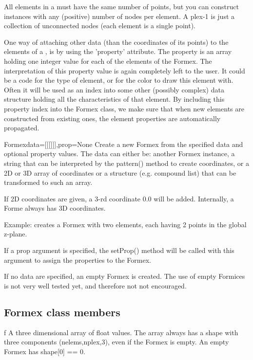 All elements in a  must have the same number of points, but you can construct  instances with any (positive) number of nodes per element. A plex-1  is just a collection of unconnected nodes (each element is a single point).

One way of attaching other data (than the coordinates of its points) to the elements of a , is by using the 'property' attribute. The property is an array holding one integer value for each of the elements of the Formex. The interpretation of this property value is again completely left to the user. It could be a code for the type of element, or for the color to draw this element with. Often it will be used as an index into some other (possibly complex) data structure holding all the characteristics of that element. 
By including this property index into the Formex class, we make sure that when new elements are constructed from existing ones, the element properties are automatically propagated.


\begin{classdesc}{Formex}{data=[[[]]],prop=None}
Create a new Formex from the specified data and optional property values.
The data can either be: another Formex instance, a string that can be 
interpreted by the pattern() method to create coordinates, or a 2D or 3D array
of coordinates or a structure (e.g. compound list) that can be transformed to
such an array.
 
If 2D coordinates are given, a 3-rd coordinate 0.0 will be added.
Internally, a Forme always has 3D coordinates.
      
Example: 
creates a Formex with two elements, each having 2 points in the global z-plane.

If a prop argument is specified, the setProp() method will be called with this
argument to assign the properties to the Formex.

If no data are specified, an empty Formex is created. The use of empty Formices
is not very well tested yet, and therefore not not encouraged.
\end{classdesc}

\subsection{Formex class members}

\begin{memberdesc}  [Coords]{f}
A three dimensional array of float values. The array always has a shape with three components (nelems,nplex,3), even if the Formex is empty. An empty Formex has shape[0] == 0.
\end{memberdesc}

